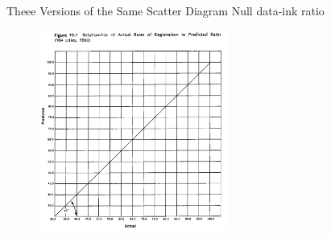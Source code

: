 \documentclass[notes, aspectratio=1610]{beamer}
\begin{document}
\begin{frame}{Theee Versions of the Same Scatter Diagram}
	{Null data-ink ratio}
	\begin{figure}
		\begin{center}
			\includegraphics[width=0.55\textwidth]{images/null.png}
		\end{center}
	\end{figure}
\end{frame}
\end{document}
